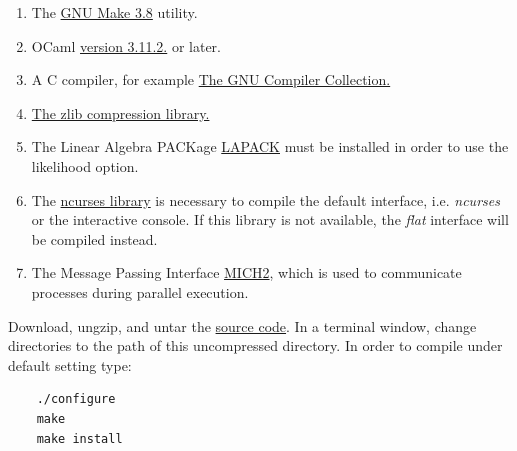 \begin{enumerate}
    \item The \href{http://www.gnu.org/software/make/}{GNU Make 3.8} utility. 
    \item OCaml \href{http://www.ocaml.org}{version 3.11.2.} or later. 
    \item A C compiler, for example \href{http://gcc.gnu.org/} {The GNU Compiler Collection.}
    \item \href{http://www.zlib.net}{The zlib compression library.}
    \item The Linear Algebra PACKage \href {http://www.netlib.org/lapack/}{LAPACK} must be installed in order to 
    use the likelihood option.
    \item The \href{http://www.gnu.org/s/ncurses} {ncurses library} is necessary to compile the default interface, 
    i.e. \emph{ncurses} or the interactive console. If this library is not available, the \emph{flat} interface will be 
    compiled instead.
   \item The Message Passing Interface \href{http://www-unix.mcs.anl.gov/mpi/}{MICH2}, which is used to communicate 
   processes during parallel execution.
\end{enumerate}
Download, ungzip, and untar the
\href{http://research.amnh.org/scicomp/projects/poy.php}{\poy source code}.  In a terminal window, change directories 
to the path of this uncompressed directory.  In order to compile under default setting type:
\begin{verbatim}
	./configure
	make
	make install
\end{verbatim}

